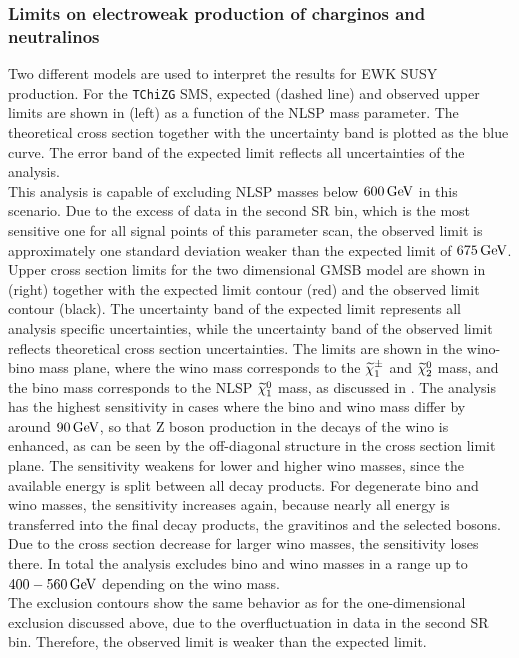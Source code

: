\subsubsection*{Limits on electroweak production of charginos and neutralinos}
Two different models are used to interpret the results for EWK SUSY production. For the \texttt{TChiZG} SMS, expected (dashed line) and observed upper limits are shown in  (left) as a function of the NLSP mass parameter. The theoretical cross section together with the uncertainty band is plotted as the blue curve.
The error band of the expected limit reflects all uncertainties of the analysis.\\
This analysis is capable of excluding NLSP masses below $600\,\text{Ge\hspace{-.08em}V}$ in this scenario. Due to the excess of data in the second SR bin, which is the most sensitive one for all signal points of this parameter scan, the observed limit is approximately one standard deviation weaker than the expected limit of $675\,\text{Ge\hspace{-.08em}V}$.\\
Upper cross section limits for the two dimensional GMSB model are shown in  (right) together with the expected limit contour (red) and the observed limit contour (black). The uncertainty band of the expected limit represents all analysis specific uncertainties, while the uncertainty band of the observed limit reflects theoretical cross section uncertainties. The limits are shown in the wino-bino mass plane, where the wino mass corresponds to the $\widetilde{\chi}^\pm_{1}$ and $\widetilde{\chi}^{0}_{2}$ mass, and the bino mass corresponds to the NLSP $\widetilde{\chi}^{0}_{1}$ mass, as discussed in . The analysis has the highest sensitivity in cases where the bino and wino mass differ by around $90\,\text{Ge\hspace{-.08em}V}$, so that Z boson production in the decays of the wino is enhanced, as can be seen by the off-diagonal structure in the cross section limit plane. The sensitivity weakens for lower and higher wino masses, since the available energy is split between all decay products. For degenerate bino and wino masses, the sensitivity increases again, because nearly all energy is transferred into the final decay products, the gravitinos and the selected bosons. Due to the cross section decrease for larger wino masses, the sensitivity loses there. In total the analysis excludes bino and wino masses in a range up to $400-560\,\text{Ge\hspace{-.08em}V}$ depending on the wino mass.\\
The exclusion contours show the same behavior as for the one-dimensional exclusion discussed above, due to the overfluctuation in data in the second SR bin. Therefore, the observed limit is weaker than the expected limit.
